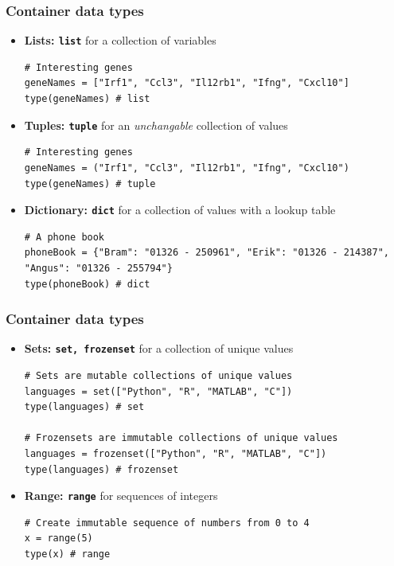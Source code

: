\documentclass[xcolor=table]{beamer}
\begin{document}
\begin{frame}[fragile]
\frametitle{Container data types}

\begin{itemize}\addtolength{\itemsep}{-0.5\baselineskip}
\item<1-> \textbf{Lists: \texttt{list}} for a collection of variables
\begin{lstlisting}[style=python]
# Interesting genes
geneNames = ["Irf1", "Ccl3", "Il12rb1", "Ifng", "Cxcl10"]
type(geneNames) # list
\end{lstlisting}

\item<2-> \textbf{Tuples: \texttt{tuple}} for an \emph{unchangable} collection of values
\begin{lstlisting}[style=python]
# Interesting genes
geneNames = ("Irf1", "Ccl3", "Il12rb1", "Ifng", "Cxcl10")
type(geneNames) # tuple
\end{lstlisting}

\item<3-> \textbf{Dictionary: \texttt{dict}} for a collection of values with a lookup table
\begin{lstlisting}[style=python]
# A phone book
phoneBook = {"Bram": "01326 - 250961", "Erik": "01326 - 214387", "Angus": "01326 - 255794"}
type(phoneBook) # dict
\end{lstlisting}

\end{itemize}
\end{frame}

\begin{frame}[fragile]
\frametitle{Container data types}

\begin{itemize}\addtolength{\itemsep}{0.5\baselineskip}

\item<1-> \textbf{Sets: \texttt{set, frozenset}} for a collection of unique values
\begin{lstlisting}[style=python]
# Sets are mutable collections of unique values
languages = set(["Python", "R", "MATLAB", "C"])
type(languages) # set

# Frozensets are immutable collections of unique values
languages = frozenset(["Python", "R", "MATLAB", "C"])
type(languages) # frozenset
\end{lstlisting}

\item<2-> \textbf{Range: \texttt{range}} for sequences of integers
\begin{lstlisting}[style=python]
# Create immutable sequence of numbers from 0 to 4
x = range(5)
type(x) # range
\end{lstlisting}

\end{itemize}

\end{frame}
\end{document}
